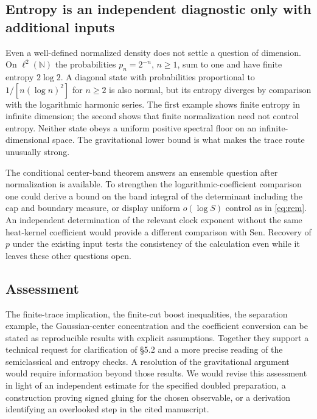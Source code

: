 \documentclass[11pt]{article}
\begin{document}
\subsection{Entropy is an independent diagnostic only with additional inputs}
Even a well-defined normalized density does not settle a question of dimension. On $\ell^2(\mathbb N)$ the probabilities $p_n=2^{-n}$, $n\ge1$, sum to one and have finite entropy $2\log2$. A diagonal state with probabilities proportional to $1/[n(\log n)^2]$ for $n\ge2$ is also normal, but its entropy diverges by comparison with the logarithmic harmonic series. The first example shows finite entropy in infinite dimension; the second shows that finite normalization need not control entropy. Neither state obeys a uniform positive spectral floor on an infinite-dimensional space. The gravitational lower bound is what makes the trace route unusually strong.

The conditional center-band theorem answers an ensemble question after normalization is available. To strengthen the logarithmic-coefficient comparison one could derive a bound on the band integral of the determinant including the cap and boundary measure, or display uniform $o(\log S)$ control as in \eqref{eq:rem}. An independent determination of the relevant clock exponent without the same heat-kernel coefficient would provide a different comparison with Sen. Recovery of $p$ under the existing input tests the consistency of the calculation even while it leaves these other questions open.

\subsection{Assessment}
The finite-trace implication, the finite-cut boost inequalities, the separation example, the Gaussian-center concentration and the coefficient conversion can be stated as reproducible results with explicit assumptions. Together they support a technical request for clarification of \S5.2 and a more precise reading of the semiclassical and entropy checks. A resolution of the gravitational argument would require information beyond those results. We would revise this assessment in light of an independent estimate for the specified doubled preparation, a construction proving signed gluing for the chosen observable, or a derivation identifying an overlooked step in the cited manuscript.
\end{document}
